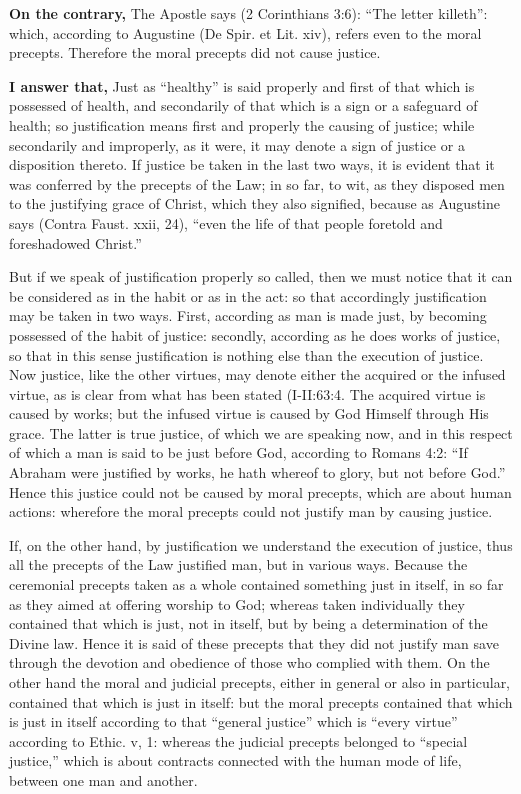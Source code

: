 \textbf{On the contrary,} The Apostle says (2 Corinthians 3:6): ``The letter killeth'': which, according to Augustine (De Spir. et Lit. xiv), refers even to the moral precepts. Therefore the moral precepts did not cause justice.

\textbf{I answer that,} Just as ``healthy'' is said properly and first of that which is possessed of health, and secondarily of that which is a sign or a safeguard of health; so justification means first and properly the causing of justice; while secondarily and improperly, as it were, it may denote a sign of justice or a disposition thereto. If justice be taken in the last two ways, it is evident that it was conferred by the precepts of the Law; in so far, to wit, as they disposed men to the justifying grace of Christ, which they also signified, because as Augustine says (Contra Faust. xxii, 24), ``even the life of that people foretold and foreshadowed Christ.''

But if we speak of justification properly so called, then we must notice that it can be considered as in the habit or as in the act: so that accordingly justification may be taken in two ways. First, according as man is made just, by becoming possessed of the habit of justice: secondly, according as he does works of justice, so that in this sense justification is nothing else than the execution of justice. Now justice, like the other virtues, may denote either the acquired or the infused virtue, as is clear from what has been stated (I-II:63:4. The acquired virtue is caused by works; but the infused virtue is caused by God Himself through His grace. The latter is true justice, of which we are speaking now, and in this respect of which a man is said to be just before God, according to Romans 4:2: ``If Abraham were justified by works, he hath whereof to glory, but not before God.'' Hence this justice could not be caused by moral precepts, which are about human actions: wherefore the moral precepts could not justify man by causing justice.

If, on the other hand, by justification we understand the execution of justice, thus all the precepts of the Law justified man, but in various ways. Because the ceremonial precepts taken as a whole contained something just in itself, in so far as they aimed at offering worship to God; whereas taken individually they contained that which is just, not in itself, but by being a determination of the Divine law. Hence it is said of these precepts that they did not justify man save through the devotion and obedience of those who complied with them. On the other hand the moral and judicial precepts, either in general or also in particular, contained that which is just in itself: but the moral precepts contained that which is just in itself according to that ``general justice'' which is ``every virtue'' according to Ethic. v, 1: whereas the judicial precepts belonged to ``special justice,'' which is about contracts connected with the human mode of life, between one man and another.

